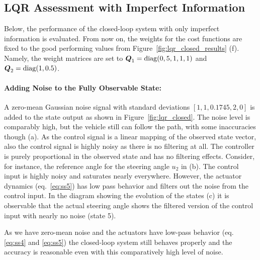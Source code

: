 \subsection{LQR Assessment with Imperfect Information}
Below, the performance of the closed-loop system with only imperfect information is evaluated.
From now on, the weights for the cost functions are fixed to the good performing values from Figure~\ref{fig:lqr_closed_results} (f). Namely, the weight matrices are set to $\boldsymbol{Q}_1=\mathop{\mathrm{diag}}(0, 5, 1, 1, 1)$ and $\boldsymbol{Q}_2=\mathop{\mathrm{diag}}(1, 0.5)$.

\paragraph{Adding Noise to the Fully Observable State:} A zero-mean Gaussian noise signal with standard deviations $\left[1, 1, 0.1745, 2, 0\right]$ is added to the state output as shown in Figure~\ref{fig:lqr_closed}. 
The noise level is comparably high, but the vehicle still can follow the path, with some inaccuracies though (a).
As the control signal is a linear mapping of the observed state vector, also the control signal is highly noisy as there is no filtering at all.
The controller is purely proportional in the observed state and has no filtering effects.
Consider, for instance, the reference angle for the steering angle $u_2$ in (b). 
The control input is highly noisy and saturates nearly everywhere.
However, the actuator dynamics (eq.~\ref{eq:ss5}) has low pass behavior and filters out the noise from the control input.
In the diagram showing the evolution of the states (c) it is observable that the actual steering angle shows the filtered version of the control input with nearly no noise (state 5).

As we have zero-mean noise and the actuators have low-pass behavior (eq. \ref{eq:ss4} and \ref{eq:ss5}) the closed-loop system still behaves properly and the accuracy is reasonable even with this comparatively high level of noise.


